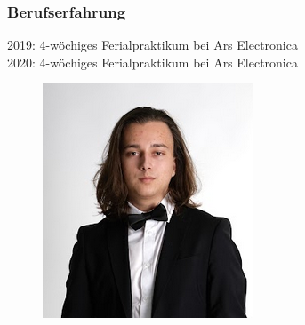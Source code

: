 \subsubsection{Berufserfahrung}
2019: 4-wöchiges Ferialpraktikum bei Ars Electronica\\
2020: 4-wöchiges Ferialpraktikum bei Ars Electronica
\begin{figure}[H]
    \includegraphics[scale=0.6]{pics/ben.png}
\end{figure}

